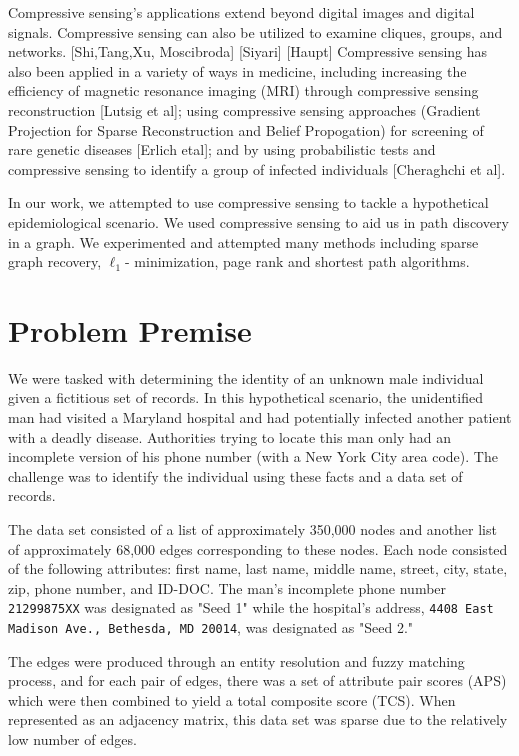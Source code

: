 \documentclass{article} %
\begin{document}
Compressive sensing's applications extend beyond digital images and digital signals. Compressive sensing can also be utilized to examine cliques, groups, and networks. [Shi,Tang,Xu, Moscibroda] [Siyari] [Haupt] Compressive sensing has also been applied in a variety of ways in medicine, including increasing the efficiency of magnetic resonance imaging (MRI) through compressive sensing reconstruction [Lutsig et al]; using compressive sensing approaches (Gradient Projection for Sparse Reconstruction and Belief Propogation) for screening of rare genetic diseases [Erlich etal]; and by using probabilistic tests and compressive sensing to identify a group of infected individuals [Cheraghchi et al]. 

In our work, we attempted to use compressive sensing to tackle a hypothetical epidemiological scenario. We used compressive sensing to aid us in path discovery in a graph. We experimented and attempted many methods including sparse graph recovery, $\ell_1$- minimization, page rank and shortest path algorithms.


\section{Problem Premise}




We were tasked with determining the identity of an unknown male individual given a fictitious set of records. In this hypothetical scenario, the unidentified man had visited a Maryland hospital and had potentially infected another patient with a deadly disease. Authorities trying to locate this man only had an incomplete version of his phone number (with a New York City area code). The challenge was to identify the individual using these facts and a data set of records. 




The data set consisted of a list of approximately 350,000 nodes and another list of approximately 68,000 edges corresponding to these nodes. Each node consisted of the following attributes: first name, last name, middle name, street, city, state, zip, phone number, and ID-DOC. The man's incomplete phone number \texttt{21299875XX} was designated as "Seed 1" while the hospital's address, \texttt{4408 East Madison Ave., Bethesda, MD 20014}, was designated as "Seed 2."




The edges were produced through an entity resolution and fuzzy matching process, and for each pair of edges, there was a set of attribute pair scores (APS) which were then combined to yield a total composite score (TCS). When represented as an adjacency matrix, this data set was sparse due to the relatively low number of edges.
\end{document}
